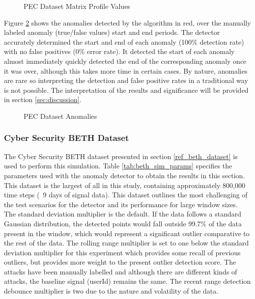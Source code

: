 \begin{figure}[H]
    
    \caption{PEC Dataset Matrix Profile Values}
    \label{fig:pec_mp_hist}
\end{figure}

Figure \ref{fig:pec_outliers} shows the anomalies detected by the algorithm in red, over the manually labeled anomaly (true/false values) start and end periods. The detector accurately determined the start and end of each anomaly (100\% detection rate) with no false positives (0\% error rate). It detected the start of each anomaly almost immediately quickly detected the end of the corresponding anomaly once it was over, although this takes more time in certain cases. By nature, anomalies are rare so interpreting the detection and false positive rates in a traditional way is not possible. The interpretation of the results and significance will be provided in section \ref{sec:discussion}.
 
\begin{figure}[H]
    
    \caption{PEC Dataset Anomalies}
    \label{fig:pec_outliers}
\end{figure}

\subsubsection{Cyber Security BETH Dataset}
\label{ref_results_beth_sim}
The Cyber Security BETH dataset presented in section \ref{ref_beth_dataset} is used to perform this simulation. Table \ref{tab:beth_sim_params} specifies the parameters used with the anomaly detector to obtain the results in this section. This dataset is the largest of all in this study, containing approximately 800,000 time steps (~9 days of signal data). This dataset outlines the most challenging of the test scenarios for the detector and its performance for large window sizes. The standard deviation multiplier is the default. If the data follows a standard Gaussian distribution, the detected points would fall outside 99.7\% of the data present in the window, which would represent a significant outlier comparative to the rest of the data. The rolling range multiplier is set to one below the standard deviation multiplier for this experiment which provides some recall of previous outliers, but provides more weight to the present outlier detection score. The attacks have been manually labelled and although there are different kinds of attacks, the baseline signal (userId) remains the same. The recent range detection debounce multiplier is two due to the nature and volatility of the data.

